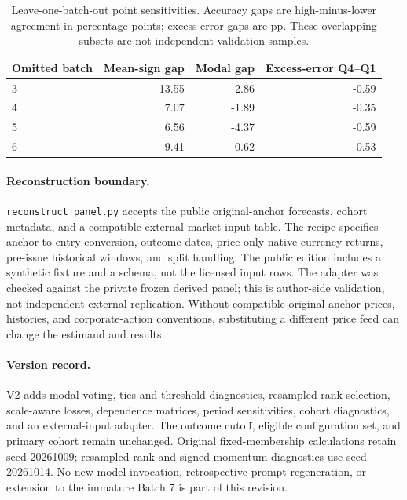 \begin{table}[H]
\centering\small
\begin{tabular}{lrrr}
\toprule
Omitted batch & Mean-sign gap & Modal gap & Excess-error Q4--Q1\\
\midrule
3 & 13.55 & 2.86 & -0.59\\
4 & 7.07 & -1.89 & -0.35\\
5 & 6.56 & -4.37 & -0.59\\
6 & 9.41 & -0.62 & -0.53\\
\bottomrule
\end{tabular}
\caption{Leave-one-batch-out point sensitivities. Accuracy gaps are high-minus-lower agreement in percentage points; excess-error gaps are pp. These overlapping subsets are not independent validation samples.}
\end{table}
\paragraph{Reconstruction boundary.} \texttt{reconstruct\_panel.py} accepts the public original-anchor forecasts, cohort metadata, and a compatible external market-input table. The recipe specifies anchor-to-entry conversion, outcome dates, price-only native-currency returns, pre-issue historical windows, and split handling. The public edition includes a synthetic fixture and a schema, not the licensed input rows. The adapter was checked against the private frozen derived panel; this is author-side validation, not independent external replication. Without compatible original anchor prices, histories, and corporate-action conventions, substituting a different price feed can change the estimand and results.

\paragraph{Version record.} V2 adds modal voting, ties and threshold diagnostics, resampled-rank selection, scale-aware losses, dependence matrices, period sensitivities, cohort diagnostics, and an external-input adapter. The outcome cutoff, eligible configuration set, and primary cohort remain unchanged. Original fixed-membership calculations retain seed 20261009; resampled-rank and signed-momentum diagnostics use seed 20261014. No new model invocation, retrospective prompt regeneration, or extension to the immature Batch 7 is part of this revision.
